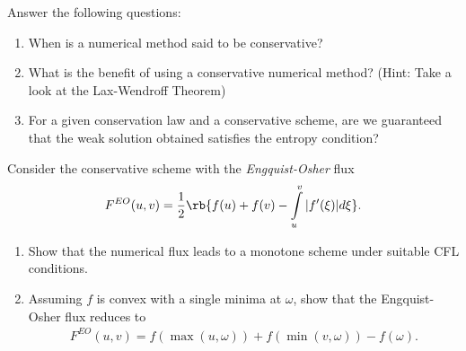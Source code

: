 \documentclass{article}
\begin{document}





\begin{exerciseList}


\item
Answer the following questions:
\begin{enumerate}
\item
When is a numerical method said to be conservative?

\item
What is the benefit of using a conservative numerical method? (Hint: Take a look at the Lax-Wendroff Theorem)

\item
For a given conservation law and a conservative scheme, are we guaranteed that the weak solution obtained satisfies the entropy condition?
\end{enumerate}

\item
Consider the conservative scheme with the \textit{Engquist-Osher} flux
\begin{gather}
F^{EO}(u,v) = \frac{1}{2} \rb{ f(u) + f(v) - \int \limits_u^v |f^\prime(\xi)|  d\xi}.
\end{gather}
\begin{enumerate}
\item Show that the numerical flux leads to a monotone scheme under suitable CFL conditions.

\item Assuming $f$ is convex with a single minima at $\omega$, show that the Engquist-Osher flux reduces to
\begin{gather}
F^{EO}(u,v) = f(\max(u,\omega)) + f(\min(v,\omega)) - f(\omega).
\end{gather}
\end{enumerate}



\end{exerciseList}
\end{document}

